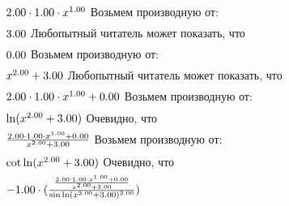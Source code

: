 \begin{math}
2.00 \cdot 1.00 \cdot x ^ {1.00 }\\
\end{math}
Возьмем производную от:
\begin{gather}
\end{gather}
\begin{math}
3.00 \\
\end{math}
Любопытный читатель может показать, что
\begin{gather}
\end{gather}
\begin{math}
0.00 \\
\end{math}
Возьмем производную от:
\begin{gather}
\end{gather}
\begin{math}
x ^ {2.00 }+ 3.00 \\
\end{math}
Любопытный читатель может показать, что
\begin{gather}
\end{gather}
\begin{math}
2.00 \cdot 1.00 \cdot x ^ {1.00 }+ 0.00 \\
\end{math}
Возьмем производную от:
\begin{gather}
\end{gather}
\begin{math}
\ln (x ^ {2.00 }+ 3.00 )\\
\end{math}
Очевидно, что
\begin{gather}
\end{gather}
\begin{math}
\frac {2.00 \cdot 1.00 \cdot x ^ {1.00 }+ 0.00 }{x ^ {2.00 }+ 3.00 }\\
\end{math}
Возьмем производную от:
\begin{gather}
\end{gather}
\begin{math}
\cot \ln (x ^ {2.00 }+ 3.00 )\\
\end{math}
Очевидно, что
\begin{gather}
\end{gather}
\begin{math}
-1.00 \cdot (\frac {\frac {2.00 \cdot 1.00 \cdot x ^ {1.00 }+ 0.00 }{x ^ {2.00 }+ 3.00 }}{\sin \ln (x ^ {2.00 }+ 3.00 )^ {2.00 }})\\
\end{math}
